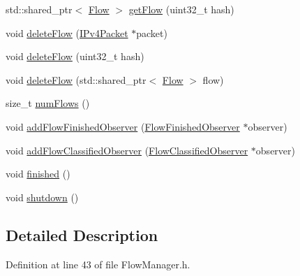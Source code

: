 \begin{DoxyCompactItemize}
\item 
std\-::shared\-\_\-ptr$<$ \hyperlink{class_vsid_common_1_1_flow}{Flow} $>$ \hyperlink{class_vsid_common_1_1_flow_manager_a42933b8fa0011eb3f635e72658bf4697}{get\-Flow} (uint32\-\_\-t hash)
\item 
void \hyperlink{class_vsid_common_1_1_flow_manager_a5e3d398ded3ad62f8677cab1515f5c4e}{delete\-Flow} (\hyperlink{class_vsid_common_1_1_i_pv4_packet}{I\-Pv4\-Packet} $\ast$packet)
\item 
void \hyperlink{class_vsid_common_1_1_flow_manager_a76aaaf9bf9106ff54161f5349f15e0de}{delete\-Flow} (uint32\-\_\-t hash)
\item 
void \hyperlink{class_vsid_common_1_1_flow_manager_a971f03f5e5e56bb4db8611be6f16f5e3}{delete\-Flow} (std\-::shared\-\_\-ptr$<$ \hyperlink{class_vsid_common_1_1_flow}{Flow} $>$ flow)
\item 
size\-\_\-t \hyperlink{class_vsid_common_1_1_flow_manager_aabf9d276ad8e588573805ac40160e108}{num\-Flows} ()
\item 
void \hyperlink{class_vsid_common_1_1_flow_manager_a590e1aaa6abd10dd64838ab7fda9d499}{add\-Flow\-Finished\-Observer} (\hyperlink{class_vsid_common_1_1_flow_finished_observer}{Flow\-Finished\-Observer} $\ast$observer)
\item 
void \hyperlink{class_vsid_common_1_1_flow_manager_ac6f9a96795952bcbf9c028be4db2dd20}{add\-Flow\-Classified\-Observer} (\hyperlink{class_vsid_common_1_1_flow_classified_observer}{Flow\-Classified\-Observer} $\ast$observer)
\item 
void \hyperlink{class_vsid_common_1_1_flow_manager_a8b55d3d066632a576b2e5c82b69d5860}{finished} ()
\item 
void \hyperlink{class_vsid_common_1_1_flow_manager_a631e775596b97c611f2fb3ee7e207295}{shutdown} ()
\end{DoxyCompactItemize}


\subsection{Detailed Description}


Definition at line 43 of file Flow\-Manager.\-h.



